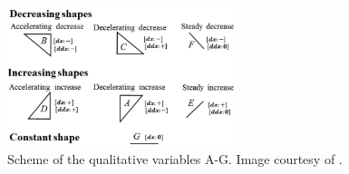\begin{figure}[ht!]
  \centering
  \includegraphics[width=0.6\textwidth]{images/shapes.jpg}
  \caption[]
  {\small Scheme of the qualitative variables A-G. Image courtesy of \textcite{samadi2017}.}
  \label{fig:shapes}
\end{figure}
